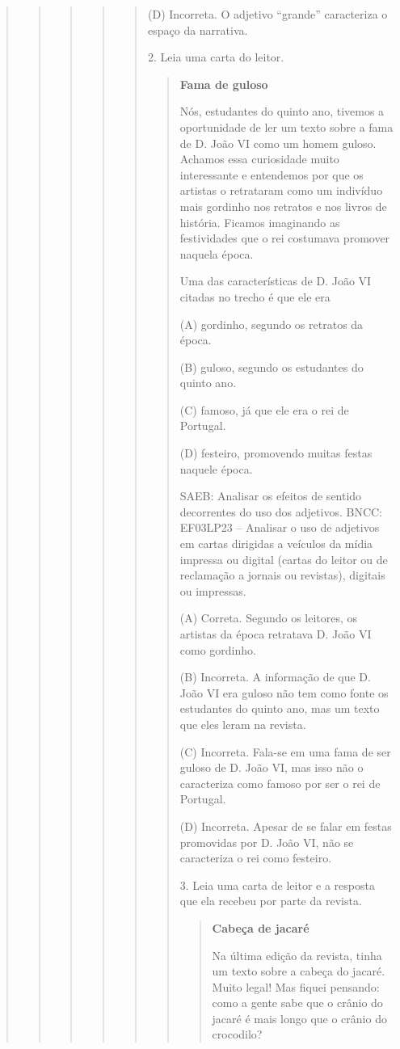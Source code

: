 \begin{quote}
\begin{quote}
\begin{quote}
\begin{quote}
\begin{quote}
(D) Incorreta. O adjetivo ``grande'' caracteriza o espaço da narrativa.

2. Leia uma carta do leitor.

\begin{quote}
\textbf{Fama de guloso}

Nós, estudantes do quinto ano, tivemos a oportunidade de ler um texto sobre a fama de D. João VI como um homem guloso. Achamos essa curiosidade muito interessante e entendemos por que os artistas o retrataram como um indivíduo mais gordinho nos retratos e nos livros de história. Ficamos imaginando as festividades que o rei costumava promover naquela época.


Uma das características de D. João VI citadas no trecho é que ele era

(A) gordinho, segundo os retratos da época.

(B) guloso, segundo os estudantes do quinto ano.

(C) famoso, já que ele era o rei de Portugal.

(D) festeiro, promovendo muitas festas naquele época.

SAEB: Analisar os efeitos de sentido decorrentes do uso dos adjetivos.
BNCC: EF03LP23 -- Analisar o uso de adjetivos em cartas dirigidas a
veículos da mídia impressa ou digital (cartas do leitor ou de reclamação
a jornais ou revistas), digitais ou impressas.

(A) Correta. Segundo os leitores, os artistas da época retratava D. João VI como gordinho.

(B) Incorreta. A informação de que D. João VI era guloso não tem como fonte os estudantes do quinto ano, mas um texto que eles leram na revista.

(C) Incorreta. Fala-se em uma fama de ser guloso de D. João VI, mas isso não o caracteriza como famoso por ser o rei de Portugal.

(D) Incorreta. Apesar de se falar em festas promovidas por D. João VI, não se caracteriza o rei como festeiro.

3. Leia uma carta de leitor e a resposta que ela recebeu por parte da revista.

\begin{quote}
\textbf{Cabeça de jacaré}

Na última edição da revista, tinha um texto sobre a cabeça do jacaré.
Muito legal! Mas fiquei pensando: como a gente sabe que o crânio do jacaré
é mais longo que o crânio do crocodilo?


\end{quote}
\end{quote}
\end{quote}
\end{quote}
\end{quote}
\end{quote}
\end{quote}
